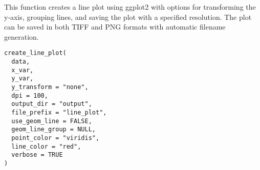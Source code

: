 \documentclass[a4paper]{book}
\begin{document}
%
\begin{Description}
This function creates a line plot using ggplot2 with options for transforming the y-axis, grouping lines, and saving the plot with a specified resolution. The plot can be saved in both TIFF and PNG formats with automatic filename generation.
\end{Description}
%
\begin{Usage}
\begin{verbatim}
create_line_plot(
  data,
  x_var,
  y_var,
  y_transform = "none",
  dpi = 100,
  output_dir = "output",
  file_prefix = "line_plot",
  use_geom_line = FALSE,
  geom_line_group = NULL,
  point_color = "viridis",
  line_color = "red",
  verbose = TRUE
)
\end{verbatim}
\end{Usage}
%
\end{document}
